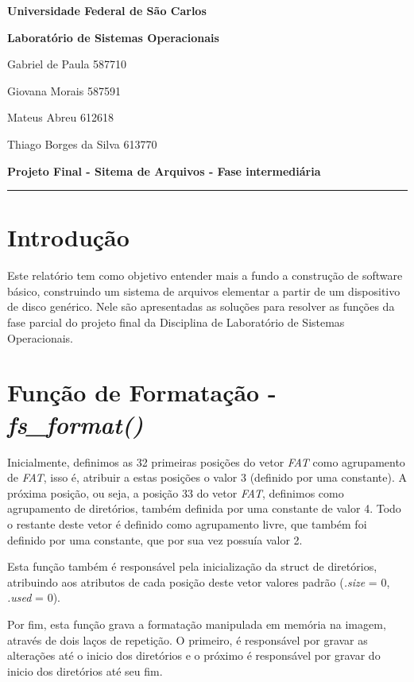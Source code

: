 \documentclass[11pt]{article}
\begin{document}
\begin{center}\textbf{Universidade Federal de São Carlos}\end{center}
\begin{center}\textbf{Laboratório de Sistemas Operacionais}\end{center}

\noindent Gabriel de Paula \hfill 587710

\noindent Giovana Morais \hfill 587591

\noindent Mateus Abreu \hfill 612618

\noindent Thiago Borges da Silva \hfill 613770

\noindent \textbf{Projeto Final - Sitema de Arquivos - Fase intermediária}

\noindent \rule{\linewidth}{1.5pt}

\section{Introdução}
Este relatório tem como objetivo entender mais a fundo a construção de software básico, construindo um sistema de arquivos elementar a partir de um dispositivo de disco genérico. Nele são apresentadas as soluções para resolver as funções da fase parcial do projeto final da Disciplina de Laboratório de Sistemas Operacionais.

\section{Função de Formatação - \textit{fs\_format()}}
\par
Inicialmente, definimos as 32 primeiras posições do vetor \textit{FAT} como agrupamento de \textit{FAT}, isso é, atribuir a estas posições o valor 3 (definido por uma constante). A próxima posição, ou seja, a posição 33 do vetor \textit{FAT}, definimos como agrupamento de diretórios, também definida por uma constante de valor 4. Todo o restante deste vetor é definido como agrupamento livre, que também foi definido por uma constante, que por sua vez possuía valor 2. 
\par
Esta função também é responsável pela inicialização da struct de diretórios, atribuindo aos  atributos de cada posição deste vetor valores padrão (\textit{.size} = 0, \textit{.used} = 0).
\par
Por fim, esta função grava a formatação manipulada em memória na imagem, através de dois laços de repetição. O primeiro, é responsável por gravar as alterações até o inicio dos diretórios e o próximo é responsável por gravar do inicio dos diretórios até seu fim.
\end{document}
